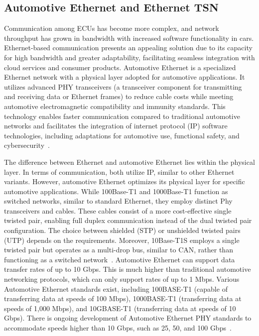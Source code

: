     
    
    \subsection{Automotive Ethernet and Ethernet TSN}
    
    Communication among ECUs has become more complex, and network throughput has grown in bandwidth with increased software functionality in cars. Ethernet-based communication presents an appealing solution due to its capacity for high bandwidth and greater adaptability, facilitating seamless integration with cloud services and consumer products.
    Automotive Ethernet is a specialized Ethernet network with a physical layer adopted for automotive applications. It utilizes advanced PHY transceivers (a transceiver component for transmitting and receiving data or Ethernet frames) to reduce cable costs while meeting automotive electromagnetic compatibility and immunity standards. This technology enables faster communication compared to traditional automotive networks and facilitates the integration of internet protocol (IP) software technologies, including adaptations for automotive use, functional safety, and cybersecurity~\cite{samii2018level, matheus2021automotive}.
    
    
    The difference between Ethernet and automotive Ethernet lies within the physical layer. In terms of communication, both utilize IP, similar to other Ethernet variants. However, automotive Ethernet optimizes its physical layer for specific automotive applications. While 100Base-T1 and 1000Base-T1 function as switched networks, similar to standard Ethernet, they employ distinct Phy transceivers and cables. These cables consist of a more cost-effective single twisted pair, enabling full duplex communication instead of the dual twisted pair configuration. The choice between shielded (STP) or unshielded twisted pairs (UTP) depends on the requirements. Moreover, 10Base-T1S employs a single twisted pair but operates as a multi-drop bus, similar to CAN, rather than functioning as a switched network~\cite{samii2018level, AutomotiveEt}.
    Automotive Ethernet can support data transfer rates of up to 10 Gbps. This is much higher than traditional automotive networking protocols, which can only support rates of up to 1 Mbps.
    Various Automotive Ethernet standards exist, including 100BASE-T1 (capable of transferring data at speeds of 100 Mbps), 1000BASE-T1 (transferring data at speeds of 1,000 Mbps), and 10GBASE-T1 (transferring data at speeds of 10 Gbps).
    There is ongoing development of Automotive Ethernet PHY standards to accommodate speeds higher than 10 Gbps, such as 25, 50, and 100 Gbps~\cite{AutomotiveEt, AutomotiveEt1}.





